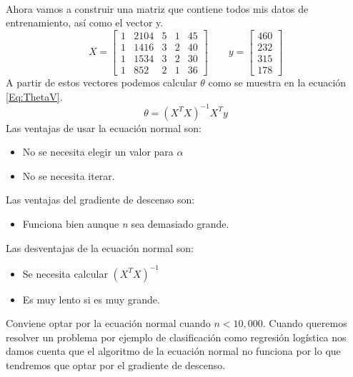 \documentclass{report}
\begin{document}
\\Ahora vamos a construir una matriz que contiene todos mis datos de entrenamiento, así como el vector y.
\[X=\left[
\begin{array}{ccccc}
	1&2104&5&1&45\\
	1&1416&3&2&40\\
	1&1534&3&2&30\\
	1&852&2&1&36
\end{array}
\right]
\qquad
y=\left[
\begin{array}{c}
460\\232\\315\\178
\end{array}
\right]
\]
A partir de estos vectores podemos calcular $\theta$ como se muestra en la ecuación \ref{Eq:ThetaV}. 
\begin{equation}
	\theta = (X^TX)^{-1}X^Ty
	\label{Eq:ThetaV}
\end{equation}
Las ventajas de usar la ecuación normal son:
\begin{itemize}
	\item No se necesita elegir un valor para $\alpha$
	\item No se necesita iterar.
\end{itemize}
Las ventajas del gradiente de descenso son:
\begin{itemize}
	\item Funciona bien aunque \textit{n} sea demasiado grande.
\end{itemize}
Las desventajas de la ecuación normal son:
\begin{itemize}
	\item Se necesita calcular $(X^TX)^{-1}$
	\item Es muy lento si  es muy grande.
\end{itemize}
Conviene optar por la ecuación normal cuando $n<10,000$. Cuando queremos resolver un problema por ejemplo de clasificación como regresión logística nos damos cuenta que el algoritmo de la ecuación normal no funciona por lo que tendremos que optar por el gradiente de descenso.
\end{document}

